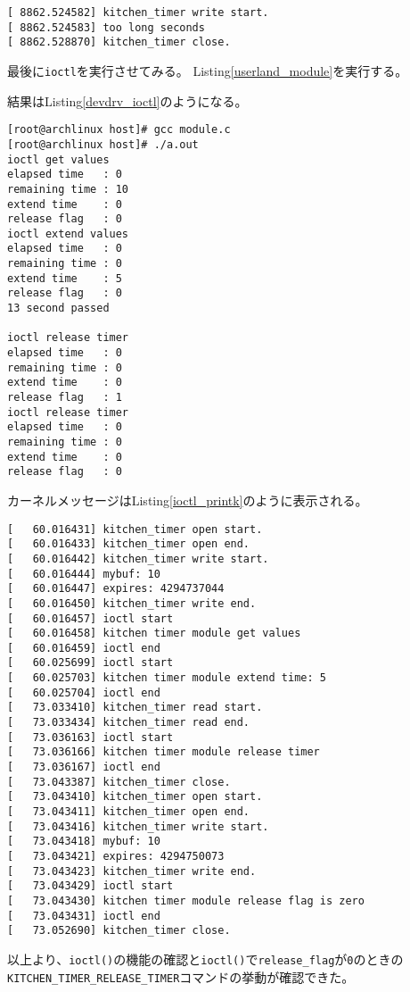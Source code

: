 \documentclass[main]{subfiles}
\begin{document}
\begin{lstlisting}[label=devdrv_exec8,caption=大きすぎる値のときのカーネルメッセージ]
[ 8862.524582] kitchen_timer write start.
[ 8862.524583] too long seconds
[ 8862.528870] kitchen_timer close.
\end{lstlisting}

最後に\texttt{ioctl}を実行させてみる。
Listing\ref{userland_module}を実行する。



結果はListing\ref{devdrv_ioctl}のようになる。

\begin{lstlisting}[label=devdrv_ioctl,caption=Listing\ref{userland_module}の実行結果]
[root@archlinux host]# gcc module.c 
[root@archlinux host]# ./a.out 
ioctl get values
elapsed time   : 0
remaining time : 10
extend time    : 0
release flag   : 0
ioctl extend values
elapsed time   : 0
remaining time : 0
extend time    : 5
release flag   : 0
13 second passed

ioctl release timer
elapsed time   : 0
remaining time : 0
extend time    : 0
release flag   : 1
ioctl release timer
elapsed time   : 0
remaining time : 0
extend time    : 0
release flag   : 0
\end{lstlisting}

カーネルメッセージはListing\ref{ioctl_printk}のように表示される。

\begin{lstlisting}[label=ioctl_printk,caption=カーネルメッセージ]
[   60.016431] kitchen_timer open start.
[   60.016433] kitchen_timer open end.
[   60.016442] kitchen_timer write start.
[   60.016444] mybuf: 10
[   60.016447] expires: 4294737044
[   60.016450] kitchen_timer write end.
[   60.016457] ioctl start
[   60.016458] kitchen timer module get values
[   60.016459] ioctl end
[   60.025699] ioctl start
[   60.025703] kitchen timer module extend time: 5
[   60.025704] ioctl end
[   73.033410] kitchen_timer read start.
[   73.033434] kitchen_timer read end.
[   73.036163] ioctl start
[   73.036166] kitchen timer module release timer
[   73.036167] ioctl end
[   73.043387] kitchen_timer close.
[   73.043410] kitchen_timer open start.
[   73.043411] kitchen_timer open end.
[   73.043416] kitchen_timer write start.
[   73.043418] mybuf: 10
[   73.043421] expires: 4294750073
[   73.043423] kitchen_timer write end.
[   73.043429] ioctl start
[   73.043430] kitchen timer module release flag is zero
[   73.043431] ioctl end
[   73.052690] kitchen_timer close.
\end{lstlisting}

以上より、\texttt{ioctl()}の機能の確認と\texttt{ioctl()}で\texttt{release\_flag}が\texttt{0}のときの\texttt{KITCHEN\_TIMER\_RELEASE\_TIMER}コマンドの挙動が確認できた。
\end{document}

